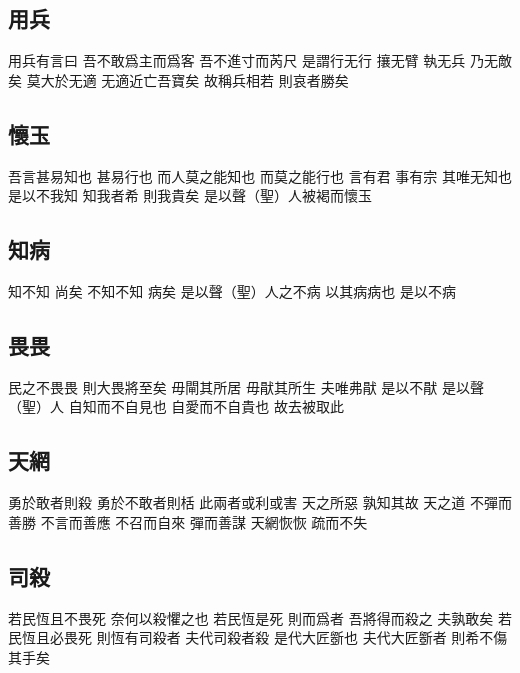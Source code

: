 \documentclass[a5paper,zihao=-4,oneside,UTF8]{ctexart}
\begin{document}
\subsection{用兵}



用兵有言曰 吾不敢爲主而爲客 吾不進寸而芮尺 
是謂行无行 攘无臂 執无兵 乃无敵矣 
莫大於无適 无適近亡吾寶矣 
故稱兵相若 則哀者勝矣 



\subsection{懷玉}



吾言甚易知也 甚易行也 而人莫之能知也 而莫之能行也 
言有君 事有宗 其唯无知也 是以不我知 
知我者希 則我貴矣 是以聲（聖）人被褐而懷玉 



\subsection{知病}



知不知 尚矣 不知不知 病矣 
是以聲（聖）人之不病 以其病病也 是以不病 



\subsection{畏畏}



民之不畏畏 則大畏將至矣 
毋閘其所居 毋猒其所生 夫唯弗猒 是以不猒 
是以聲（聖）人 自知而不自見也 自愛而不自貴也 故去被取此  



\subsection{天網}



勇於敢者則殺 勇於不敢者則栝 此兩者或利或害 
天之所惡 孰知其故 
天之道 不彈而善勝 不言而善應 不召而自來 彈而善謀 
天網恢恢 疏而不失 



\subsection{司殺}



若民恆且不畏死 奈何以殺懼之也 
若民恆是死 則而爲者 吾將得而殺之 夫孰敢矣 
若民恆且必畏死 則恆有司殺者 
夫代司殺者殺 是代大匠斵也 夫代大匠斵者 則希不傷其手矣 
\end{document}
